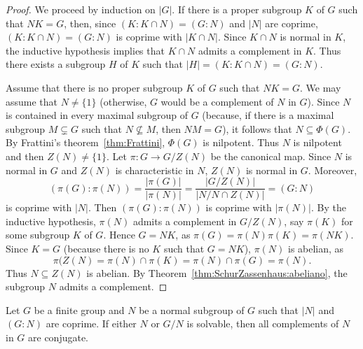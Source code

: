 \begin{proof}
	We proceed by induction on $|G|$. If there is a proper subgroup $K$ of 
	$G$ such that $NK=G$, then, since $(K:K\cap N)=(G:N)$ and $|N|$ are coprime,
	$(K:K\cap N)=(G:N)$ is coprime with $|K\cap N|$. Since $K\cap N$ is normal in $K$,
	the inductive hypothesis implies that $K\cap N$ admits a complement in $K$. Thus there exists 
    a subgroup $H$ of $K$ such that $|H|=(K:K\cap N)=(G:N)$. 

    Assume that there is no proper subgroup $K$ of $G$ such that 
	$NK=G$. We may assume that $N\ne\{1\}$ (otherwise, $G$ would be a complement of $N$ in $G$). Since $N$ is contained in 
    every maximal subgroup of $G$ (because, if there is a maximal subgroup $M\subsetneq G$ such that 
	$N\not\subseteq M$, then $NM=G$), it follows that $N\subseteq\Phi(G)$. By Frattini's theorem~\ref{thm:Frattini}, 
    $\Phi(G)$ is nilpotent. Thus $N$ is nilpotent and then $Z(N)\ne\{1\}$. Let $\pi\colon G\to
	G/Z(N)$ be the canonical map. Since $N$ is normal in $G$ and $Z(N)$ is characteristic in $N$, 
    $Z(N)$ is normal in $G$.  Moreover, 
	\[
	(\pi(G):\pi(N))=\frac{|\pi(G)|}{|\pi(N)|}=\frac{|G/Z(N)|}{|N/N\cap Z(N)|}=(G:N)
	\]
	is coprime with $|N|$. Then $(\pi(G):\pi(N))$ is coprime with $|\pi(N)|$. By the inductive hypothesis, 
	$\pi(N)$ admits a complement in $G/Z(N)$, say $\pi(K)$
	for some subgroup $K$ of $G$. Hence $G=NK$, as 
	$\pi(G)=\pi(N)\pi(K)=\pi(NK)$. 
	Since $K=G$ (because there is no $K$ such that $G=NK$), 
	$\pi(N)$ is abelian, as 
	\[
		\pi(Z(N)=\pi(N)\cap\pi(K)=\pi(N)\cap\pi(G)=\pi(N).
	\]
	Thus $N\subseteq Z(N)$ is abelian. By Theorem~\ref{thm:SchurZassenhaus:abeliano}, the subgroup $N$ 
    admits a complement. 
\end{proof}

\begin{theorem}
	\label{thm:SchurZassenhaus:conjugation}
    Let $G$ be a finite group and $N$ be a normal subgroup of $G$ such that 
    $|N|$ and 
	$(G:N)$ are coprime. If either $N$ or $G/N$ is solvable, then 
    all complements of $N$ in $G$ are conjugate. 
\end{theorem}

%
%
%


